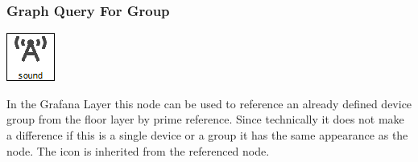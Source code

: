 \subsubsection{Graph Query For Group}
\noindent\begin{minipage}{0.15\textwidth}%
\includegraphics[width=\linewidth]{assets/images/group2}
\end{minipage}%
\hfill%
\begin{minipage}{0.8\textwidth}
In the Grafana Layer this node can be used to reference an already defined device group from the floor layer by prime reference. Since technically it does not make a difference if this is a single device or a group it has the same appearance as the  node. The icon is inherited from the referenced node.
\end{minipage}


